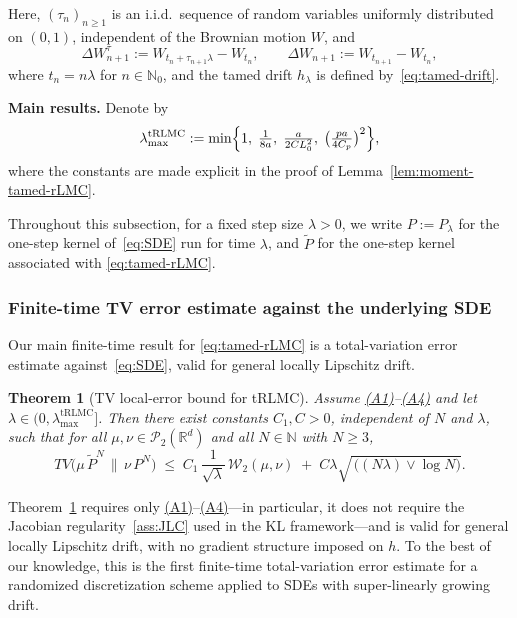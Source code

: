 \documentclass[11pt,a4paper,reqno]{amsart}
\theoremstyle{plain}
\newtheorem{theorem}{Theorem}
\theoremstyle{definition}
\theoremstyle{remark}
\newcommand{\R}{\mathbb{R}}
\newcommand{\W}{\mathcal{W}_2}
\begin{document}
Here, \((\tau_n)_{n\ge1}\) is an i.i.d.\ sequence of random variables uniformly distributed on \((0,1)\), independent of the Brownian motion \(W\), and
\[
\Delta W_{n+1}^{\tau}:=W_{t_n+\tau_{n+1}\lambda}-W_{t_n},
\qquad
\Delta W_{n+1}:=W_{t_{n+1}}-W_{t_n},
\]
where \(t_n=n\lambda\) for \(n\in\mathbb N_0\), and the tamed drift \(h_\lambda\) is defined by~\eqref{eq:tamed-drift}.

\medskip
\noindent\textbf{Main results.}
Denote by
\begin{equation}\label{eq:lambda-max-trlmc}
\lambda_{\max}^{\mathrm{tRLMC}}
:=
\min\Bigl\{
1,\;
\tfrac{1}{8a},\;
\tfrac{a}{2CL_0^2},\;
\bigl(\tfrac{pa}{4C_p}\bigr)^{2}
\Bigr\},
\end{equation}
where the constants are made explicit in the proof of Lemma~\ref{lem:moment-tamed-rLMC}.

\medskip
\noindent
Throughout this subsection, for a fixed step size \(\lambda>0\), we write \(P:=P_\lambda\) for the one-step kernel of~\eqref{eq:SDE} run for time $\lambda$, and \(\widetilde P\) for the one-step kernel associated with \eqref{eq:tamed-rLMC}.


\subsubsection{Finite-time TV error estimate against the underlying SDE}
\label{subsubsec:trlmc-general}

Our main finite-time result for \eqref{eq:tamed-rLMC} is a total-variation error estimate against~\eqref{eq:SDE}, valid for general locally Lipschitz drift.

\begin{theorem}[TV local-error bound for tRLMC]\label{thm:tv-local-tRLMC}
Assume \hyperref[ass:PJG]{\textup{(A1)}}--\hyperref[ass:D]{\textup{(A4)}} and let \(\lambda\in(0,\lambda_{\max}^{\mathrm{tRLMC}}]\). Then there exist constants \(C_1,C>0\), independent of \(N\) and \(\lambda\), such that for all \(\mu,\nu\in\mathcal P_2(\R^d)\) and all \(N\in\mathbb N\) with \(N\ge3\),
\begin{equation}
  TV\!\bigl(\mu\,\widetilde P^{N}\,\big\|\,\nu\,P^{N}\bigr)
  \;\le\;
  C_1\,\frac{1}{\sqrt{\lambda}}\,\W(\mu,\nu)
  \;+\;
  C\lambda \sqrt{\,\bigl((N\lambda)\vee \log N\bigr)} .
\end{equation}
\end{theorem}

Theorem~\ref{thm:tv-local-tRLMC} requires only \hyperref[ass:PJG]{(A1)}--\hyperref[ass:D]{(A4)}---in particular, it does not require the Jacobian regularity~\ref{ass:JLC} used in the KL framework---and is valid for general locally Lipschitz drift, with no gradient structure imposed on $h$. To the best of our knowledge, this is the first finite-time total-variation error estimate for a randomized discretization scheme applied to SDEs with super-linearly growing drift.
\end{document}
